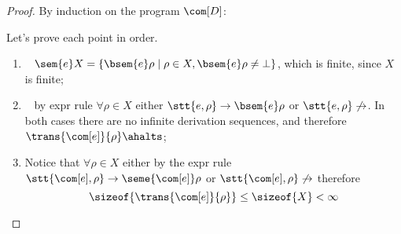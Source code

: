 \begin{proof}
  By induction on the program \(\com[D]\):
  \begin{inductive}
     Let's prove each point in order.
    \begin{enumerate}[label=(\roman*).]
    \item~\label{it:1}
      \(\sem{e}X = \{\bsem{e}\rho \mid \rho \in X , \bsem{e}\rho \neq
      \bot\}\), which is finite, since \(X\) is finite;
    \item~\label{it:2} by expr rule \(\forall \rho \in X\) either
      \(\stt{e,\rho} \to \bsem{e}\rho\) or \(\stt{e,\rho} \not\to\). In
      both cases there are no infinite derivation sequences, and therefore
      \(\trans{\com[e]}{\rho} \ahalts\);
    \item Notice that \(\forall \rho \in X\) either by the expr rule
      \(\stt{\com[e], \rho} \to \seme{\com[e]}\rho\) or
      \(\stt{\com[e], \rho}\not\to\) therefore
      \[\sizeof{\trans{\com[e]}{\rho}} \leq \sizeof{X} < \infty\]
    \end{enumerate}
    

\end{inductive}
\end{proof}
